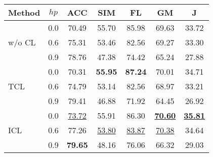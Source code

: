 \begin{table}[th]
\begin{subtable}{\linewidth}
\begin{tabular}{lcccccc}
			\hline
			{Method}&$hp$ &  {ACC} & {SIM} & {FL} & {GM} & {J}\\
			\hline
			\multirow{3}{*}{w/o CL}& 0.0 & 70.49 & 55.70 & 85.98 & 69.63& 33.72 \\
			& 0.6 &75.31 & 53.46 & 82.56 & 69.27& 33.30\\
			& 0.9 & 78.76 & 47.38 & 74.42 &65.24 & 27.88\\
						\hline
			\multirow{3}{*}{TCL } & 0.0 & 70.31 & \textbf{55.95} &\textbf{87.24} &  70.01& 34.71 \\
			& 0.6 & 74.79 & 53.14 & 82.56 & 68.97 & 33.21 \\
			& 0.9 & 79.41 & 46.88 & 71.92 &64.45 & 26.92 \\
			\hline
			\multirow{3}{*}{ICL}& 0.0 & \underline{73.72} & 55.91 & 86.30 & \underline{\textbf{70.60}} &\underline{\textbf{35.81}}\\
			& 0.6 & 77.26 & \underline{53.80} & \underline{83.87} & \underline{70.38} & 34.64\\
			& 0.9 & \textbf{79.65} & 48.16 & 76.06 & 66.32 & 29.03\\


\end{tabular}
\end{subtable}
\end{table}
